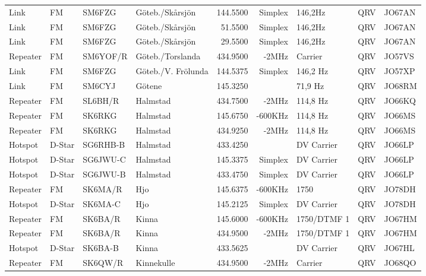 \begin{landscape}
\begin{longtable}{llllrrlcl}
Link     & FM     & SM6FZG   & Göteb./Skårsjön     & 144.5500  & Simplex & 146,2Hz         & QRV  & JO67AN \\
Link     & FM     & SM6FZG   & Göteb./Skårsjön     & 51.5500   & Simplex & 146,2Hz         & QRV  & JO67AN \\
Link     & FM     & SM6FZG   & Göteb./Skårsjön     & 29.5500   & Simplex & 146,2Hz         & QRV  & JO67AN \\
Repeater & FM     & SM6YOF/R & Göteb./Torslanda    & 434.9500  & -2MHz   & Carrier         & QRV  & JO57VS \\
Link     & FM     & SM6FZG   & Göteb./V. Frölunda  & 144.5375  & Simplex & 146,2 Hz        & QRV  & JO57XP \\
Link     & FM     & SM6CYJ   & Götene              & 145.3250  &         & 71,9 Hz         & QRV  & JO68RM \\
Repeater & FM     & SL6BH/R  & Halmstad            & 434.7500  & -2MHz   & 114,8 Hz        & QRV  & JO66KQ \\
Repeater & FM     & SK6RKG   & Halmstad            & 145.6750  & -600KHz & 114,8 Hz        & QRV  & JO66MS \\
Repeater & FM     & SK6RKG   & Halmstad            & 434.9250  & -2MHz   & 114,8 Hz        & QRV  & JO66MS \\
Hotspot  & D-Star & SG6RHB-B & Halmstad            & 433.4250  &         & DV Carrier      & QRV  & JO66LP \\
Hotspot  & D-Star & SG6JWU-C & Halmstad            & 145.3375  & Simplex & DV Carrier      & QRV  & JO66LP \\
Hotspot  & D-Star & SG6JWU-B & Halmstad            & 433.4750  & Simplex & DV Carrier      & QRV  & JO66LP \\
Repeater & FM     & SK6MA/R  & Hjo                 & 145.6375  & -600KHz & 1750            & QRV  & JO78DH \\
Hotspot  & D-Star & SK6MA-C  & Hjo                 & 145.2125  & Simplex & DV Carrier      & QRV  & JO78DH \\
Repeater & FM     & SK6BA/R  & Kinna               & 145.6000  & -600KHz & 1750/DTMF 1     & QRV  & JO67HM \\
Repeater & FM     & SK6BA/R  & Kinna               & 434.9500  & -2MHz   & 1750/DTMF 1     & QRV  & JO67HM \\
Hotspot  & D-Star & SK6BA-B  & Kinna               & 433.5625  &         & DV Carrier      & QRV  & JO67HL \\
Repeater & FM     & SK6QW/R  & Kinnekulle          & 434.9500  & -2MHz   & Carrier         & QRV  & JO68QO \\

\end{longtable}
\end{landscape}
